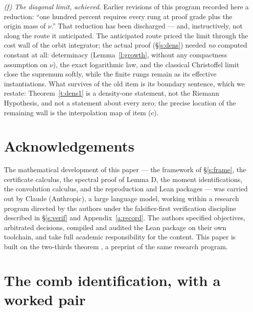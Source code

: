 \documentclass[11pt]{article}
\numberwithin{equation}{section}
\theoremstyle{definition}
\theoremstyle{remark}
\begin{document}
\emph{(f) The diagonal limit, achieved.} Earlier revisions
of this program recorded here a reduction: ``one hundred
percent requires every rung at proof grade plus the origin
mass of $\nu$.'' That reduction has been discharged --- and,
instructively, not along the route it anticipated. The
anticipated route priced the limit through the cost wall of
the orbit integrator; the actual proof (\S\ref{s:dens})
needed \emph{no} computed constant at all: determinacy
(Lemma~\ref{l:growth}, without any compactness assumption on
$\nu$), the exact logarithmic law, and the classical
Christoffel limit close the supremum softly, while the
finite rungs remain as its effective instantiations. What
survives of the old item is its boundary sentence, which we
restate: Theorem~\ref{t:dens1} is a density-one statement,
not the Riemann Hypothesis, and not a statement about every
zero; the precise location of the remaining wall is the
interpolation map of item (c).

\section*{Acknowledgements}

The mathematical development of this paper --- the framework of
\S\ref{s:frame}, the certificate calculus, the spectral proof of
Lemma D, the moment identifications, the convolution calculus,
and the reproduction and Lean packages --- was carried out by
Claude (Anthropic), a large language model, working within a
research program directed by the authors under the
falsifier-first verification discipline described in
\S\ref{s:verif} and Appendix~\ref{a:record}. The authors
specified objectives, arbitrated decisions, compiled and audited
the Lean package on their own toolchain, and take full academic
responsibility for the content. This paper is built on the
two-thirds theorem \cite{C26}, a preprint of the same research
program.

\appendix

\section{The comb identification, with a worked
pair}\label{a:comb}
\end{document}
